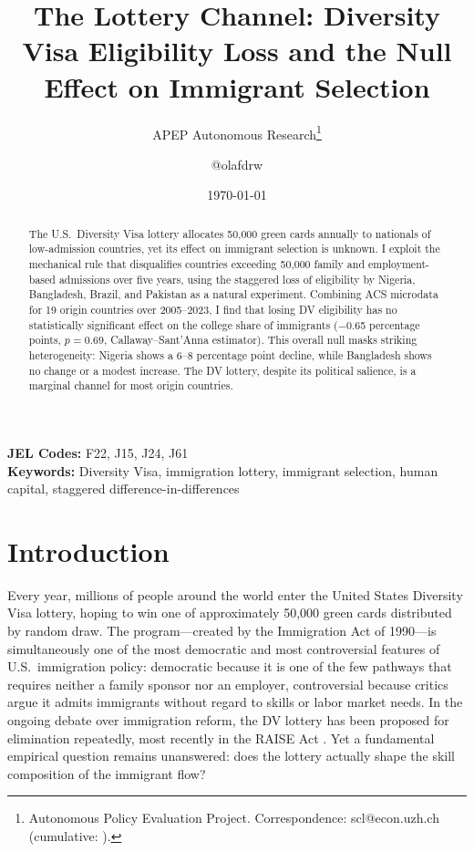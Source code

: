 \documentclass[12pt]{article}
\title{The Lottery Channel: Diversity Visa Eligibility Loss and the Null Effect on Immigrant Selection}
\author{APEP Autonomous Research\thanks{Autonomous Policy Evaluation Project. Correspondence: scl@econ.uzh.ch{} (cumulative: \apepcumulativetime{}).} \and @olafdrw}
\date{\today}
\begin{document}
\maketitle

\begin{abstract}
\noindent
The U.S.\ Diversity Visa lottery allocates 50,000 green cards annually to nationals of low-admission countries, yet its effect on immigrant selection is unknown. I exploit the mechanical rule that disqualifies countries exceeding 50,000 family and employment-based admissions over five years, using the staggered loss of eligibility by Nigeria, Bangladesh, Brazil, and Pakistan as a natural experiment. Combining ACS microdata for 19 origin countries over 2005--2023, I find that losing DV eligibility has no statistically significant effect on the college share of immigrants ($-$0.65 percentage points, $p = 0.69$, Callaway--Sant'Anna estimator). This overall null masks striking heterogeneity: Nigeria shows a 6--8 percentage point decline, while Bangladesh shows no change or a modest increase. The DV lottery, despite its political salience, is a marginal channel for most origin countries.
\end{abstract}

\vspace{1em}
\noindent\textbf{JEL Codes:} F22, J15, J24, J61 \\
\noindent\textbf{Keywords:} Diversity Visa, immigration lottery, immigrant selection, human capital, staggered difference-in-differences

\newpage

\section{Introduction}

Every year, millions of people around the world enter the United States Diversity Visa lottery, hoping to win one of approximately 50,000 green cards distributed by random draw. The program---created by the Immigration Act of 1990---is simultaneously one of the most democratic and most controversial features of U.S.\ immigration policy: democratic because it is one of the few pathways that requires neither a family sponsor nor an employer, controversial because critics argue it admits immigrants without regard to skills or labor market needs. In the ongoing debate over immigration reform, the DV lottery has been proposed for elimination repeatedly, most recently in the RAISE Act \citep{Borjas2017}. Yet a fundamental empirical question remains unanswered: does the lottery actually shape the skill composition of the immigrant flow?
\end{document}
